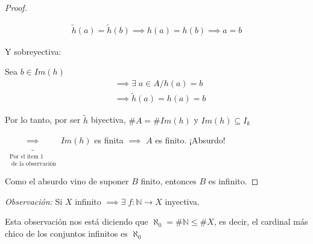 \begin{enumerate}
\begin{proof}
\begin{enumerate}
                    \begin{gather*}
                        \tilde{h}(a) = \tilde{h}(b) 
                        \implies h(a) = h(b) \implies a = b
                    \end{gather*}

                    Y sobreyectiva:

                    Sea $b \in Im(h)$
                    \begin{align*}
                        &\implies \exists \; a \in A / h(a) = b \\
                        &\implies \tilde{h}(a) = h(a) = b
                    \end{align*}

                    \medskip

                    Por lo tanto, por ser $\tilde{h}$ biyectiva,
                    $\#A = \#Im(h)$
                    y 
                    $Im(h) \subseteq I_k$

                $\underbrace{\implies}_{\substack{\text{Por el item 1}\\%
                \text{ de la observación}}} %
                Im(h)$ es finita
                $\implies$ 
                $A$ es finito. ¡Absurdo!
            \end{enumerate}

            Como el absurdo vino de suponer $B$ finito, entonces $B$ es
            infinito.

        \end{proof}
\end{enumerate}

\bigskip
\textit{Observación:} 
Si $X$ infinito $\implies \exists\; f:\mathbb{N}\to X$ inyectiva.

\medskip

Esta observación nos está diciendo que $\aleph_0 = \# \mathbb{N} \leq \# X$,
es decir, el cardinal más chico de los conjuntos infinitos es $\aleph_0$

